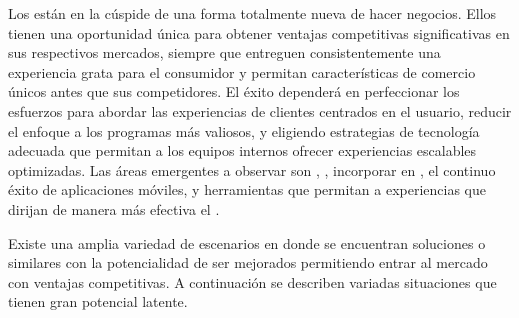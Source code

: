 Los \online \retailers están en la cúspide de una forma totalmente nueva de hacer negocios. Ellos tienen una oportunidad única para obtener ventajas competitivas significativas en sus respectivos mercados, siempre que entreguen consistentemente una experiencia grata para el consumidor y permitan características de comercio \multichannel únicos antes que sus competidores. El éxito dependerá en perfeccionar los esfuerzos para abordar las experiencias de clientes centrados en el usuario, reducir el enfoque a los programas más valiosos, y eligiendo estrategias de tecnología adecuada que permitan a los equipos internos ofrecer experiencias escalables optimizadas. Las áreas emergentes a observar son \realTimeINT, \retail \analytics, incorporar \socialnetwork en \ecommerceCOM, el continuo éxito de aplicaciones móviles, y herramientas que permitan a \retailers \scale experiencias que dirijan de manera más efectiva el \merchandising.


Existe una amplia variedad de escenarios en donde se encuentran soluciones \ecommerceCOM o similares con la potencialidad de ser mejorados permitiendo entrar al mercado con ventajas competitivas. A continuación se describen variadas situaciones que tienen gran potencial latente.

